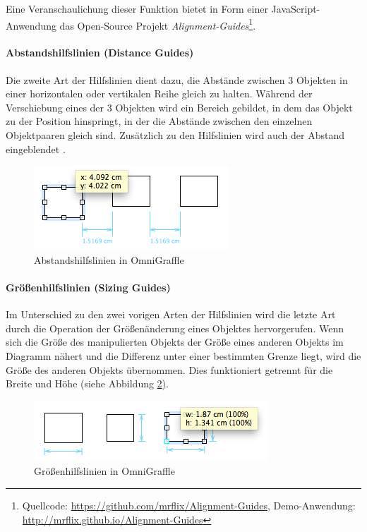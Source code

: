 Eine Veranschaulichung dieser Funktion bietet in Form einer JavaScript-Anwendung das Open-Source Projekt \textit{Alignment-Guides}\footnote{Quellcode: \url{https://github.com/mrflix/Alignment-Guides}, Demo-Anwendung: \url{http://mrflix.github.io/Alignment-Guides}}.

\paragraph{Abstandshilfslinien (Distance Guides)}

Die zweite Art der Hilfslinien dient dazu, die Abstände zwischen 3 Objekten in einer horizontalen oder vertikalen Reihe gleich zu halten. Während der Verschiebung eines der 3 Objekten wird ein Bereich gebildet, in dem das Objekt zu der Position hinspringt, in der die Abstände zwischen den einzelnen Objektpaaren gleich sind. Zusätzlich zu den Hilfslinien wird auch der Abstand eingeblendet \cite{11Keynote, Olsen10OmniGraffle}.

\begin{figure}[hbt]
    \centering
    \includegraphics{resources/omnigraffle-distance-guides.png}
    \caption{Abstandshilfslinien in OmniGraffle}
    \label{fig:omnigraffle-distance-guides}
\end{figure}

\paragraph{Größenhilfslinien (Sizing Guides)}

Im Unterschied zu den zwei vorigen Arten der Hilfslinien wird die letzte Art durch die Operation der Größenänderung eines Objektes hervorgerufen. Wenn sich die Größe des manipulierten Objekts der Größe eines anderen Objekts im Diagramm nähert und die Differenz unter einer bestimmten Grenze liegt, wird die Größe des anderen Objekts übernommen. Dies funktioniert getrennt für die Breite und Höhe (siehe Abbildung \ref{fig:omnigraffle-sizing-guides}).

\begin{figure}[hbt]
    \centering
    \includegraphics{resources/omnigraffle-sizing-guides.png}
    \caption{Größenhilfslinien in OmniGraffle}
    \label{fig:omnigraffle-sizing-guides}
\end{figure}

